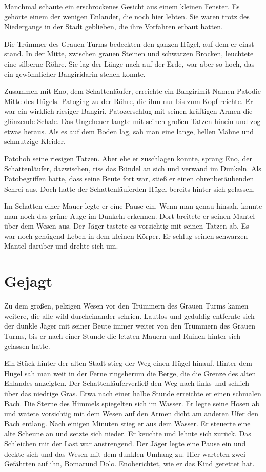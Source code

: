 \documentclass[12pt,a4paper,onecolumn,twoside,ngerman]{book}
\newcommand{\Bangiri}{Bangiri}
\newcommand{\Pato}{Pato}
\newcommand{\Enland}{Enland}
\newcommand{\Schattenjager}{Schattenläufer}
\newcommand{\Eno}{Eno}
\newcommand{\Bomar}{Bomar}
\newcommand{\Dolo}{Dolo}
\begin{document}
Manchmal schaute ein erschrockenes Gesicht aus einem kleinen Fenster. Es gehörte einem der wenigen \Enland{er}, die noch hier lebten. Sie waren trotz des Niedergangs in der Stadt geblieben, die ihre Vorfahren erbaut hatten.

Die Trümmer des Grauen Turms bedeckten den ganzen Hügel, auf dem er einst stand. In der Mitte, zwischen grauen Steinen und schwarzen Brocken, leuchtete eine silberne Röhre. Sie lag der Länge nach auf der Erde, war aber so hoch, das ein gewöhnlicher \Bangiri darin stehen konnte. 

Zusammen mit \Eno, dem \Schattenjager {,} erreichte ein \Bangiri mit Namen \Pato die Mitte des Hügels.  \Pato ging zu der Röhre, die ihm nur bis zum Kopf reichte. Er war ein wirklich riesiger \Bangiri{.} \Pato zerschlug mit seinen kräftigen Armen die glänzende Schale. Das Ungeheuer langte mit seinen großen Tatzen hinein und zog etwas heraus. Als es auf dem Boden lag, sah man eine lange, hellen Mähne und schmutzige Kleider. 

\Pato hob seine riesigen Tatzen. Aber ehe er zuschlagen konnte, sprang \Eno{,} der \Schattenjager{,} dazwischen, riss das Bündel an sich und verwand im Dunkeln. Als \Pato begriffen hatte, dass seine Beute fort war, stieß er einen ohrenbetäubenden Schrei aus. Doch hatte der \Schattenjager den Hügel bereits hinter sich gelassen.

Im Schatten einer Mauer legte er eine Pause ein. Wenn man genau hinsah, konnte man noch das grüne Auge im Dunkeln erkennen. Dort breitete er seinen Mantel über dem Wesen aus. Der Jäger tastete es vorsichtig mit seinen Tatzen ab. Es war noch genügend Leben in dem kleinen Körper. Er schlug seinen schwarzen Mantel darüber und drehte sich um.

\section{Gejagt}
Zu dem großen, pelzigen Wesen vor den Trümmern des Grauen Turms kamen weitere, die alle wild durcheinander schrien. Lautlos und geduldig entfernte sich der dunkle Jäger mit seiner Beute immer weiter von den Trümmern des Grauen Turms, bis er nach einer Stunde die letzten Mauern und Ruinen hinter sich gelassen hatte.

Ein Stück hinter der alten Stadt stieg der Weg einen Hügel hinauf. Hinter dem Hügel sah man weit in der Ferne ringsherum die Berge, die die Grenze des alten \Enland{es} anzeigten. Der \Schattenjager verließ den Weg nach links und schlich über das niedrige Gras. Etwa nach einer halbe Stunde erreichte er einen schmalen Bach. Die Sterne des Himmels spiegelten sich im Wasser. Er legte seine Hosen ab und watete vorsichtig mit dem Wesen auf den Armen dicht am anderen Ufer den Bach entlang. Nach einigen Minuten stieg er aus dem Wasser. Er steuerte eine alte Scheune an und setzte sich nieder. Er keuchte und lehnte sich zurück. Das Schleichen mit der Last war anstrengend. Der Jäger legte eine Pause ein und deckte sich und das Wesen mit dem dunklen Umhang zu. Hier warteten zwei Gefährten auf ihn, \Bomar und \Dolo.
\Eno berichtet, wie er das Kind gerettet hat.
\end{document}
